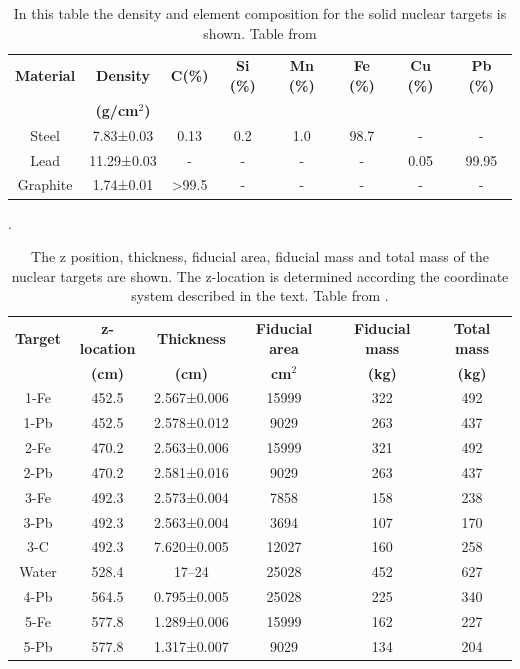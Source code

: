 \begin{itemize}
    \begin{table}[!htb]
        \centering
        \begin{tabular}{c c c c c c c c}
            \textbf{Material} & \textbf{Density} & \textbf{C(\%)} & \textbf{Si (\%)} & \textbf{Mn (\%)} & \textbf{Fe (\%)} & \textbf{Cu (\%)} & \textbf{Pb (\%)} \\ 
             & \textbf{(g/cm$^2$)} & & & & & & \\ \hline
            Steel & 7.83±0.03 & 0.13 & 0.2 & 1.0 & 98.7 & - & - \\
            Lead & 11.29±0.03 & - & - & - & - & 0.05 & 99.95\\
            Graphite & 1.74±0.01 & >99.5 & - & - & - & - & - \\ \hline
        \end{tabular}
        \caption{In this table the density and element composition for the solid nuclear targets is shown. Table from \cite{ALIAGA2014130}}.
        \label{tab:Chapter2:Detector:NuclearTargetsComposition}
    \end{table}

    \begin{table}[!htb]
        \centering
        \begin{tabular}{c c c c c c}
            \textbf{Target} & \textbf{z-location} & \textbf{Thickness} & \textbf{Fiducial area} & \textbf{Fiducial mass} & \textbf{Total mass}  \\ 
             & \textbf{(cm)} & \textbf{(cm)} & \textbf{cm$^2$} & \textbf{(kg)} & \textbf{(kg)} \\ \hline
            1-Fe & 452.5 & 2.567±0.006 & 15999 & 322 & 492 \\ 
            1-Pb & 452.5 & 2.578±0.012 & 9029 & 263 & 437 \\
            2-Fe & 470.2 & 2.563±0.006 & 15999 & 321 & 492 \\ 
            2-Pb & 470.2 & 	2.581±0.016 & 9029 & 263 & 437 \\
            3-Fe & 492.3 & 	2.573±0.004 & 7858 & 158 & 238 \\ 
            3-Pb & 492.3 & 2.563±0.004 & 3694 & 107 & 170 \\
            3-C & 492.3 & 7.620±0.005 & 12027 & 160 & 258 \\ 
            Water & 528.4 & 17–24 & 25028 & 452 & 627 \\
            4-Pb & 564.5 & 0.795±0.005 & 25028 & 225 & 340 \\
            5-Fe & 577.8 & 1.289±0.006 & 15999 & 162 & 227 \\ 
            5-Pb & 577.8 & 1.317±0.007 & 9029 & 134 & 204 \\ \hline
        \end{tabular}
        \caption{The z position, thickness, fiducial area, fiducial mass and total mass of the nuclear targets are shown. The z-location is determined according the coordinate system described in the text. Table from \cite{ALIAGA2014130}. }
        \label{tab:Chapter2:Detector:Sizes}
    \end{table}


\end{itemize}
